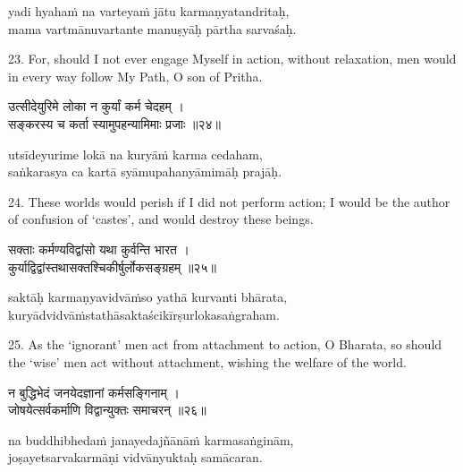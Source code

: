 \begin{transliteration}
yadi hyahaṁ na varteyaṁ jātu karmaṇyatandritaḥ, \\
mama vartmānuvartante manuṣyāḥ pārtha sarvaśaḥ.
\end{transliteration}

23. For, should I not ever engage Myself in action, without relaxation, men
would in every way follow My Path, O son of Pritha.

\begin{gitaverse}
उत्सीदेयुरिमे लोका न कुर्यां कर्म चेदहम् । \\
सङ्करस्य च कर्ता स्यामुपहन्यामिमाः प्रजाः ॥२४॥
\end{gitaverse}

\begin{transliteration}
utsīdeyurime lokā na kuryāṁ karma cedaham, \\
saṅkarasya ca kartā syāmupahanyāmimāḥ prajāḥ.
\end{transliteration}

24. These worlds would perish if I did not perform action; I would be the
author of confusion of `castes', and would destroy these beings.

\begin{gitaverse}
सक्ताः कर्मण्यविद्वांसो यथा कुर्वन्ति भारत । \\
कुर्याद्विद्वांस्तथासक्तश्चिकीर्षुर्लोकसङ्ग्रहम् ॥२५॥
\end{gitaverse}

\begin{transliteration}
saktāḥ karmaṇyavidvāṁso yathā kurvanti bhārata, \\
kuryādvidvāṁstathāsaktaścikīrṣurlokasaṅgraham.
\end{transliteration}

25. As the `ignorant' men act from attachment to action, O Bharata, so should
the `wise' men act without attachment, wishing the welfare of the world.

\begin{gitaverse}
न बुद्धिभेदं जनयेदज्ञानां कर्मसङ्गिनाम् । \\
जोषयेत्सर्वकर्माणि विद्वान्युक्तः समाचरन् ॥२६॥
\end{gitaverse}

\begin{transliteration}
na buddhibhedaṁ janayedajñānāṁ karmasaṅginām, \\
joṣayetsarvakarmāṇi vidvānyuktaḥ samācaran.
\end{transliteration}

